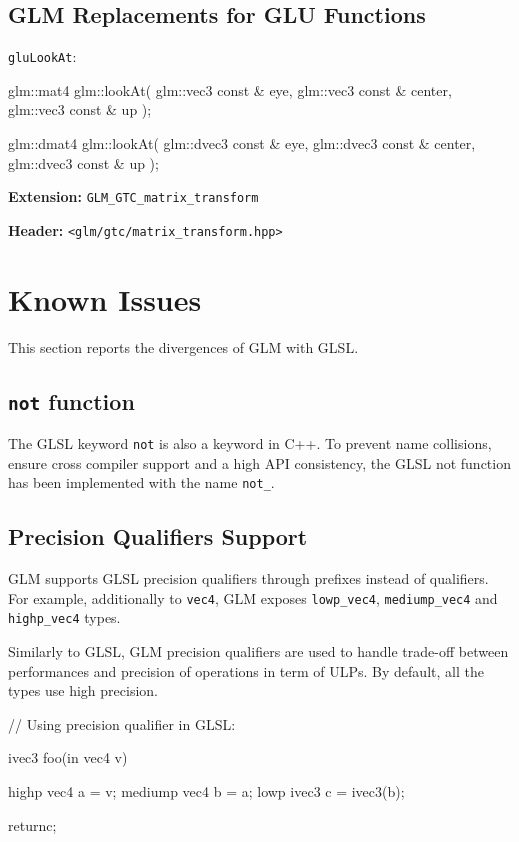 \documentclass{scrartcl}
\numberwithin{figure}{subsection}
\begin{document}
\fi


\subsection{GLM Replacements for GLU Functions}

\verb|gluLookAt|:

\begin{cppcode}
glm::mat4 glm::lookAt(
  glm::vec3 const & eye,
  glm::vec3 const & center,
  glm::vec3 const & up
);

glm::dmat4 glm::lookAt(
  glm::dvec3 const & eye,
  glm::dvec3 const & center,
  glm::dvec3 const & up
);
\end{cppcode}

\textbf{Extension:} \verb|GLM_GTC_matrix_transform|

\textbf{Header:} \verb|<glm/gtc/matrix_transform.hpp>|
 


\section{Known Issues}
This section reports the divergences of GLM with GLSL.

\subsection{\texttt{not} function}

The GLSL keyword \verb|not| is also a keyword in C++. To prevent name collisions, ensure cross compiler support and a high API consistency, the GLSL not function has been implemented with the name \verb|not_|.

\subsection{Precision Qualifiers Support}

GLM supports GLSL precision qualifiers through prefixes instead of qualifiers. For example, additionally to \verb|vec4|, GLM exposes \verb|lowp_vec4|, \verb|mediump_vec4| and \verb|highp_vec4| types.

Similarly to GLSL, GLM precision qualifiers are used to handle trade-off between performances and precision of operations in term of ULPs. 
By default, all the types use high precision.

\begin{glslcode}
// Using precision qualifier in GLSL:

ivec3 foo(in vec4 v)
{
  highp vec4 a = v;
  mediump vec4 b = a;
  lowp ivec3 c = ivec3(b);

  returnc;
}
\end{glslcode}
\end{document}
